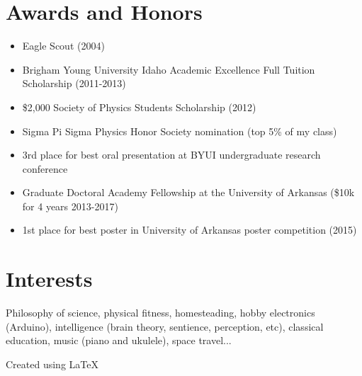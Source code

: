 \documentclass[10pt]{article}
\begin{document}
\section*{Awards and Honors}
\begin{itemize}
    \itemsep-0.5em
    \item Eagle Scout (2004)
    \item Brigham Young University Idaho Academic Excellence Full Tuition Scholarship (2011-2013)
    \item \$2,000 Society of Physics Students Scholarship (2012)
    \item Sigma Pi Sigma Physics Honor Society nomination (top 5\% of my class)
    \item 3rd place for best oral presentation at BYUI undergraduate research conference
    \item Graduate Doctoral Academy Fellowship at the University of Arkansas
        (\$10k for 4 years 2013-2017)
    \item 1st place for best poster in University of Arkansas poster competition (2015)
\end{itemize}

\section*{Interests}
Philosophy of science, physical fitness, homesteading, hobby electronics (Arduino),
intelligence (brain theory, sentience, perception, etc), classical education, music
(piano and ukulele), space travel...

{
    \vspace{20pt}
    \scriptsize\hfill Created using \LaTeX
}
\end{document}
